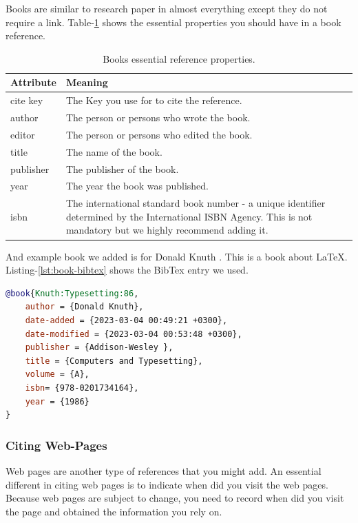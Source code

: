 Books are similar to research paper in almost everything except they do not require a link. Table-\ref{tab:book-properties} shows the essential properties you should have in a book reference. 

\begin{table}[H]
    \centering
    \begin{tabular}{p{}p{}}
        \hline\hline
        Attribute      & Meaning \\ \hline\hline
        cite key  & The Key you use for to cite the reference.  \\
        author & The person or persons who wrote the book. \\
        editor & The person or persons who edited the book. \\
        title & The name of the book. \\
        publisher & The publisher of the book. \\
        year & The year the book was published. \\
        isbn & The international standard book number - a unique identifier determined by the International ISBN Agency. This is not mandatory but we highly recommend adding it. \\ \hline
    \end{tabular}
    \caption{Books essential reference properties.}
    \label{tab:book-properties}
\end{table}

And example book we added is for Donald Knuth \cite{Knuth:Typesetting:86}. This is a book about {\LaTeX}. Listing-\ref{lst:book-bibtex} shows the BibTex entry we used. 

\begin{lstlisting}[language=BibTex,style=mystyle,caption={Sample BibTex Reference for A Book},label={lst:book-bibtex}]
@book{Knuth:Typesetting:86,
    author = {Donald Knuth},
    date-added = {2023-03-04 00:49:21 +0300},
    date-modified = {2023-03-04 00:53:48 +0300},
    publisher = {Addison-Wesley },
    title = {Computers and Typesetting},
    volume = {A},
    isbn= {978-0201734164},
    year = {1986}
}
\end{lstlisting}

\subsubsection{Citing Web-Pages}

Web pages are another type of references that you might add. An essential different in citing web pages is to indicate when did you visit the web pages. Because web pages are subject to change, you need to record when did you visit the page and obtained the information you rely on. 

